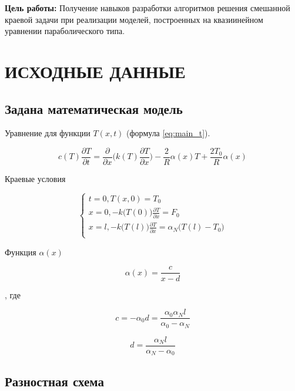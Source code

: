 \textbf{Цель работы:} Получение навыков разработки алгоритмов решения смешанной краевой задачи при реализации моделей, построенных на квазиинейном уравнении параболического типа.

\section{ИСХОДНЫЕ ДАННЫЕ}

\subsection{Задана математическая модель}

Уравнение для функции $T(x, t)$ (формула \ref{eq:main_t}).

\begin{equation}\label{eq:main_t}
    c(T) \frac{\partial T}{\partial t} = \frac{\partial}{\partial x} \bigg( k(T) \frac{\partial T}{\partial x} \bigg) - \frac{2}{R} \alpha(x) T + \frac{2T_0}{R} \alpha(x)
\end{equation}

Краевые условия

\begin{equation*}
    \begin{cases}
        t = 0, T(x, 0) = T_0 \\
        x = 0, -k \big( T(0) \big) \frac{\partial T}{\partial x} = F_0 \\
        x = l, -k \big( T(l) \big) \frac{\partial T}{\partial x} = \alpha_N \big( T(l) - T_0 \big) \\
    \end{cases}
\end{equation*}

Функция $\alpha (x)$

\begin{equation*}
    \alpha(x) = \frac{c}{x-d}
\end{equation*}

, где

\begin{equation*}
    c = -\alpha_0 d = \frac{\alpha_0 \alpha_N l}{\alpha_0 - \alpha_N}
\end{equation*}

\begin{equation*}
    d = \frac{\alpha_N l}{\alpha_N - \alpha_0}
\end{equation*}

\subsection{Разностная схема}

